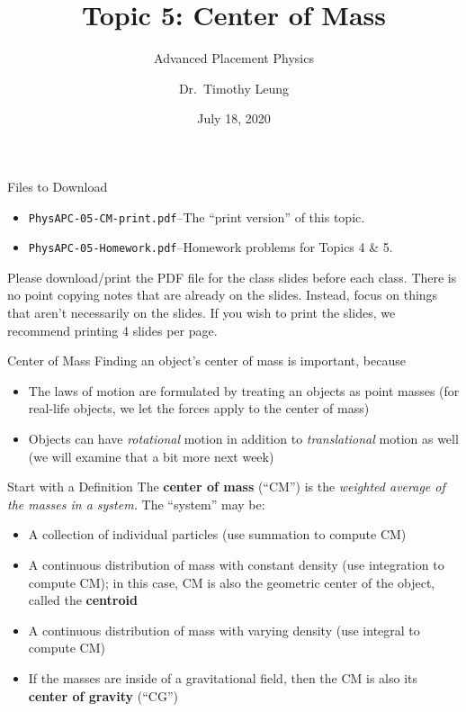\documentclass[12pt,compress,aspectratio=169]{beamer}
\title{Topic 5: Center of Mass}
\subtitle{Advanced Placement Physics}
\author[TML]{Dr.\ Timothy Leung}
\institute{Olympiads School}
\date{July 18, 2020}
\begin{document}
\begin{frame}
  \maketitle
\end{frame}



\begin{frame}{Files to Download}
  \begin{itemize}
  \item\texttt{PhysAPC-05-CM-print.pdf}--The ``print version'' of this topic.
  \item\texttt{PhysAPC-05-Homework.pdf}--Homework problems for Topics 4 \& 5.
  \end{itemize}
  
  \vspace{.1in}Please download/print the PDF file for the class slides before
  each class. There is no point copying notes that are already on the slides.
  Instead, focus on things that aren't necessarily on the slides. If you wish
  to print the slides, we recommend printing 4 slides per page.
\end{frame}



\begin{frame}{Center of Mass}
  Finding an object's center of mass is important, because
  \begin{itemize}
  \item The laws of motion are formulated by treating an objects as point
    masses (for real-life objects, we let the forces apply to the center of
    mass)
  \item Objects can have \emph{rotational} motion in addition to
    \emph{translational} motion as well (we will examine that a bit more
    next week)
  \end{itemize}
\end{frame}



\begin{frame}{Start with a Definition}
  The \textbf{center of mass} (``CM'') is the
  \emph{weighted average of the masses in a system.} The ``system'' may be:
  \begin{itemize}
  \item A collection of individual particles (use summation to compute CM)
  \item A continuous distribution of mass with constant density (use
    integration to compute CM); in this case, CM is also the geometric center
    of the object, called the \textbf{centroid}
  \item A continuous distribution of mass with varying density (use integral to
    compute CM)
  \item If the masses are inside of a gravitational field, then the CM is also
    its \textbf{center of gravity} (``CG'')
  \end{itemize}
\end{frame}
\end{document}
